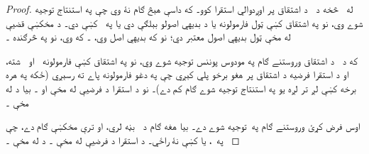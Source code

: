 \documentclass[12pt,a4paper,oneside]{report}
\renewcommand{\QR}{\LR{\latinfont QR}}
\theoremstyle{definition}
\begin{document}
\label{olpseg:OLP-0124-B010:start}
\begin{proof}
له~\LR{$\Gamma$} څخه د~ د اشتقاق پر اوږدوالي استقرا کوو۔
که داسې هېڅ ګام نۀ وي چې په استنتاج توجيه شوے وي، نو په
اشتقاق کښې ټول فارمولونه يا د بديهي اصولو بېلګې دي يا
په~\LR{$\Gamma$} کښې دي۔ د مخکښې قضیې له مخې ټول بديهي اصول
معتبر دي؛ نو که  بديهي اصل وي،
۔ که  وي، نو په څرګنده
۔
\label{olpseg:OLP-0124-B010:end}

\label{olpseg:OLP-0124-B011:start}
که د~ د اشتقاق وروستنے ګام په مودوس پوننس توجيه شوے
وي، نو په اشتقاق کښې فارمولونه~ او~
شته، او د استقرا فرضيه د اشتقاق پر هغو برخو پلي کېږي چې په
دغو فارمولونه پاے ته رسېږي (ځکه په هره برخه کښې لږ تر لږه يو
په استنتاج توجيه شوے ګام کم دے)۔ نو د استقرا د فرضيې له مخې
 او ۔ بيا د
له مخې ۔
\label{olpseg:OLP-0124-B011:end}

\label{olpseg:OLP-0124-B012:start}
اوس فرض کړئ وروستنے ګام په~\QR توجيه شوے دے۔ بيا هغه
ګام د~ بڼه لري، او ترې مخکښې ګام
 دے، چې  په~\LR{$\Gamma$}،  يا
\LR{$\lforall[x][B(x)]$} کښې نۀ راځي۔ د استقرا د فرضيې له مخې
۔ د
 له مخې
۔
\label{olpseg:OLP-0124-B012:end}


\end{proof}
\end{document}
